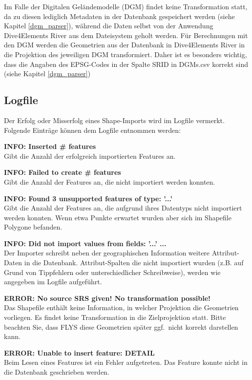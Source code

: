 Im Falle der Digitalen Geländemodelle (DGM) findet keine Transformation statt,
da zu diesen lediglich Metadaten in der Datenbank gespeichert werden
(siehe Kapitel \ref{dgm_parser}),
während die Daten selbst von der Anwendung Dive4Elements River
aus dem Dateisystem geholt werden.
Für Berechnungen mit den DGM werden die Geometrien aus der Datenbank
in Dive4Elements River in die Projektion des jeweiligen DGM transformiert.
Daher ist es besonders wichtig, dass die Angaben des EPSG-Codes
in der Spalte SRID in DGMs.csv korrekt sind (siehe Kapitel \ref{dgm_parser})

\subsection{Logfile}
Der Erfolg oder Misserfolg eines Shape-Imports wird
im Logfile vermerkt. Folgende Einträge können dem Logfile
entnommen werden:

\textbf{INFO: Inserted \# features}
\\Gibt die Anzahl der erfolgreich importierten Features an.

\textbf{INFO: Failed to create \# features}
\\Gibt die Anzahl der Features an, die nicht importiert werden konnten.

\textbf{INFO: Found 3 unsupported features of type: '...'}
\\Gibt die Anzahl der Features an, die aufgrund ihres Datentyps nicht importiert
werden konnten. Wenn etwa Punkte erwartet wurden aber sich im Shapefile
Polygone befanden.

\textbf{INFO: Did not import values from fields: '...' ...}
\\Der Importer schreibt neben der geographischen Information weitere
Attribut-Daten in die Datenbank.
Attribut-Spalten die nicht importiert wurden (z.B. auf Grund
von Tippfehlern oder unterschiedlicher Schreibweise),
werden wie angegeben im Logfile aufgeführt.

\textbf{ERROR: No source SRS given! No transformation possible!}
\\Das Shapefile enthält keine Information, in welcher Projektion die Geometrien
vorliegen. Es findet keine Transformation in die Zielprojektion statt. Bitte
beachten Sie, dass FLYS diese Geometrien später ggf.\ nicht korrekt darstellen
kann.

\textbf{ERROR: Unable to insert feature: DETAIL}
\\Beim Lesen eines Features ist ein Fehler aufgetreten.
Das Feature konnte nicht in die Datenbank geschrieben werden.

